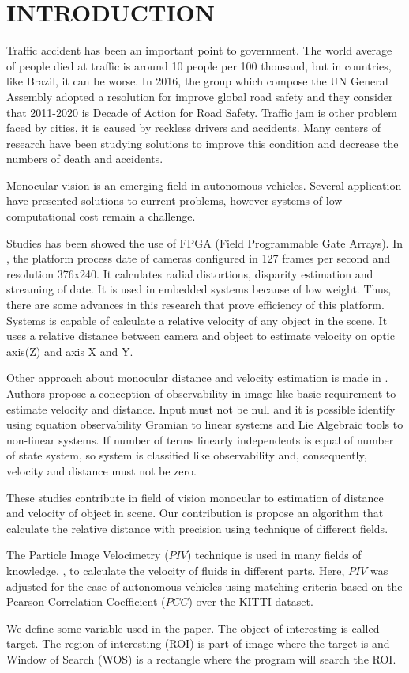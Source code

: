 \section{INTRODUCTION}

Traffic accident has been an important point to government. The world average of people
died at traffic is around 10 people per 100 thousand, but in countries, like Brazil, it can be worse.
In 2016, the group which compose the UN General Assembly adopted a resolution for
improve global road safety and they consider that 2011-2020 is Decade of Action for Road Safety.
Traffic jam is other problem faced by cities, it is caused by reckless drivers and accidents.
Many centers of research have been studying solutions to improve this condition and decrease the 
numbers of death and accidents.

Monocular vision is an emerging field in autonomous vehicles. 
Several application have presented solutions to current problems, 
however systems  of low computational cost remain a challenge.

Studies has been showed the use of FPGA (Field Programmable Gate Arrays). In \cite{Honegger}, the platform process date of 
cameras configured in 127 frames per second and resolution 376x240. It calculates radial distortions, disparity estimation
and streaming of date. It is used in embedded systems because of low weight. Thus, there are some advances in this research 
that prove efficiency of this platform. Systems is capable of calculate a relative velocity of any object in the scene. 
It uses a relative distance between camera and object to estimate velocity on optic axis(Z) and axis X and Y.

Other approach about monocular distance and velocity estimation is made in \cite{Breugel}. Authors propose a conception of 
observability in image like basic requirement to estimate velocity and distance. Input must not be null and it is possible
identify using equation observability Gramian to linear systems and Lie Algebraic tools to non-linear systems. If 
number of terms linearly independents is equal of number of state system, so system is classified like observability and, 
consequently, velocity and distance must not be zero.

These studies contribute in field of vision monocular to estimation of distance and velocity of object in scene. 
Our contribution is propose an algorithm that calculate the relative distance with precision using technique of 
different fields.


The Particle Image Velocimetry ($PIV$)\cite{Bastiaans} technique is used in many fields of 
knowledge, \cite{Story, Xu}, to calculate the velocity of fluids in different parts. 
Here, $PIV$ was adjusted for the case of autonomous vehicles using matching criteria based on 
the Pearson Correlation Coefficient ($PCC$)\cite{Miranda Neto} over the KITTI dataset\cite{Geiger}.

We define some variable used in the paper. The object of interesting is called target.
The region of interesting (ROI) is part of image where the target is and
Window of Search (WOS) is a rectangle where the program will search the ROI. 

